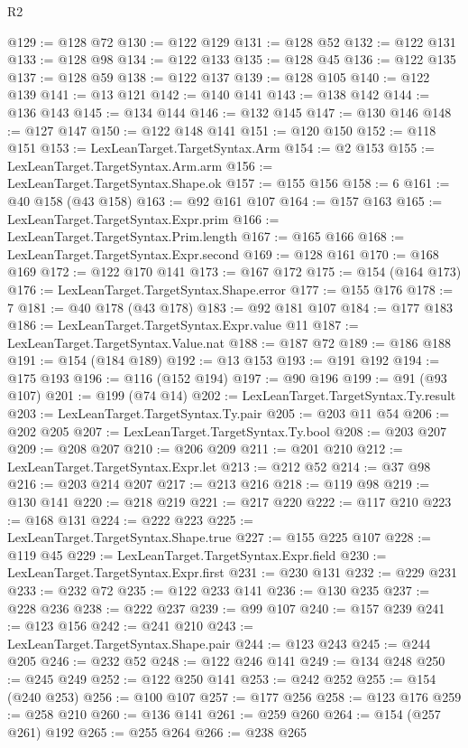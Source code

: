 \begin{lexlean}{R2}
\begin{coremodule}
{{{{{{{{{{{{{{{{{{{{{{{{{{{{{{{{{{{{{{{{{{{{{{{{{{{{{{{{{{{{{{{{{{{{{{{{{{{{{{{{{{{{{{{{{{{{@129 := @128 @72
@130 := @122 @129
@131 := @128 @52
@132 := @122 @131
@133 := @128 @98
@134 := @122 @133
@135 := @128 @45
@136 := @122 @135
@137 := @128 @59
@138 := @122 @137
@139 := @128 @105
@140 := @122 @139
@141 := @13 @121
@142 := @140 @141
@143 := @138 @142
@144 := @136 @143
@145 := @134 @144
@146 := @132 @145
@147 := @130 @146
@148 := @127 @147
@150 := @122 @148 @141
@151 := @120 @150
@152 := @118 @151
@153 := LexLeanTarget.TargetSyntax.Arm
@154 := @2 @153
@155 := LexLeanTarget.TargetSyntax.Arm.arm
@156 := LexLeanTarget.TargetSyntax.Shape.ok
@157 := @155 @156
@158 := 6
@161 := @40 @158 (@43 @158)
@163 := @92 @161 @107
@164 := @157 @163
@165 := LexLeanTarget.TargetSyntax.Expr.prim
@166 := LexLeanTarget.TargetSyntax.Prim.length
@167 := @165 @166
@168 := LexLeanTarget.TargetSyntax.Expr.second
@169 := @128 @161
@170 := @168 @169
@172 := @122 @170 @141
@173 := @167 @172
@175 := @154 (@164 @173)
@176 := LexLeanTarget.TargetSyntax.Shape.error
@177 := @155 @176
@178 := 7
@181 := @40 @178 (@43 @178)
@183 := @92 @181 @107
@184 := @177 @183
@186 := LexLeanTarget.TargetSyntax.Expr.value @11
@187 := LexLeanTarget.TargetSyntax.Value.nat
@188 := @187 @72
@189 := @186 @188
@191 := @154 (@184 @189)
@192 := @13 @153
@193 := @191 @192
@194 := @175 @193
@196 := @116 (@152 @194)
@197 := @90 @196
@199 := @91 (@93 @107)
@201 := @199 (@74 @14)
@202 := LexLeanTarget.TargetSyntax.Ty.result
@203 := LexLeanTarget.TargetSyntax.Ty.pair
@205 := @203 @11 @54
@206 := @202 @205
@207 := LexLeanTarget.TargetSyntax.Ty.bool
@208 := @203 @207
@209 := @208 @207
@210 := @206 @209
@211 := @201 @210
@212 := LexLeanTarget.TargetSyntax.Expr.let
@213 := @212 @52
@214 := @37 @98
@216 := @203 @214 @207
@217 := @213 @216
@218 := @119 @98
@219 := @130 @141
@220 := @218 @219
@221 := @217 @220
@222 := @117 @210
@223 := @168 @131
@224 := @222 @223
@225 := LexLeanTarget.TargetSyntax.Shape.true
@227 := @155 @225 @107
@228 := @119 @45
@229 := LexLeanTarget.TargetSyntax.Expr.field
@230 := LexLeanTarget.TargetSyntax.Expr.first
@231 := @230 @131
@232 := @229 @231
@233 := @232 @72
@235 := @122 @233 @141
@236 := @130 @235
@237 := @228 @236
@238 := @222 @237
@239 := @99 @107
@240 := @157 @239
@241 := @123 @156
@242 := @241 @210
@243 := LexLeanTarget.TargetSyntax.Shape.pair
@244 := @123 @243
@245 := @244 @205
@246 := @232 @52
@248 := @122 @246 @141
@249 := @134 @248
@250 := @245 @249
@252 := @122 @250 @141
@253 := @242 @252
@255 := @154 (@240 @253)
@256 := @100 @107
@257 := @177 @256
@258 := @123 @176
@259 := @258 @210
@260 := @136 @141
@261 := @259 @260
@264 := @154 (@257 @261) @192
@265 := @255 @264
@266 := @238 @265
}}}}}}}}}}}}}}}}}}}}}}}}}}}}}}}}}}}}}}}}}}}}}}}}}}}}}}}}}}}}}}}}}}}}}}}}}}}}}}}}}}}}}}}}}}}}
\end{coremodule}
\end{lexlean}
